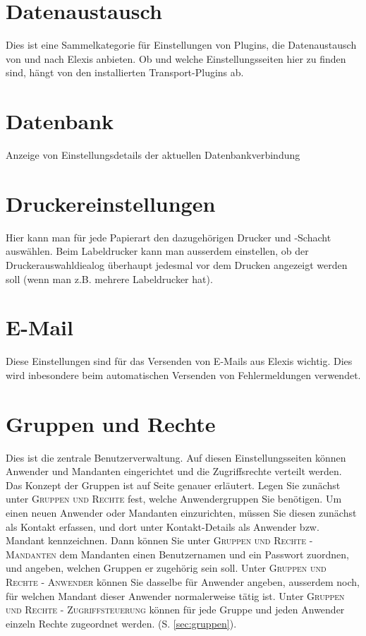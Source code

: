 \section{Datenaustausch}
Dies ist eine Sammelkategorie für Einstellungen von Plugins, die Datenaustausch von und nach Elexis anbieten. Ob und welche Einstellungsseiten hier zu finden sind, hängt von den installierten Transport-Plugins ab.
\section{Datenbank}
Anzeige von Einstellungsdetails der aktuellen Datenbankverbindung
\section{Druckereinstellungen}
Hier kann man für jede Papierart den dazugehörigen Drucker und -Schacht auswählen. Beim Labeldrucker kann man ausserdem einstellen, ob der Druckerauswahldiealog überhaupt jedesmal vor dem Drucken angezeigt werden soll (wenn man z.B. mehrere Labeldrucker hat).
\section{E-Mail}
Diese Einstellungen sind für das Versenden von E-Mails aus Elexis wichtig. Dies wird inbesondere beim automatischen Versenden von Fehlermeldungen verwendet. 

\section{Gruppen und Rechte}
Dies ist die zentrale Benutzerverwaltung. Auf diesen Einstellungsseiten können Anwender und Mandanten eingerichtet und die Zugriffsrechte verteilt werden. Das Konzept der Gruppen ist auf Seite \pageref{sec:gruppen} genauer erläutert.
Legen Sie zunächst unter \textsc{Gruppen und Rechte} fest, welche Anwendergruppen Sie benötigen.
Um einen neuen Anwender oder Mandanten einzurichten, müssen Sie diesen zunächst als \glqq Kontakt \grqq{} erfassen, und dort unter Kontakt-Details als Anwender bzw. Mandant kennzeichnen. Dann können Sie unter \textsc{Gruppen und Rechte - Mandanten} dem Mandanten einen Benutzernamen und ein Passwort zuordnen, und angeben, welchen Gruppen er zugehörig sein soll.
Unter \textsc{Gruppen und Rechte - Anwender} können Sie dasselbe für Anwender angeben, ausserdem noch, für welchen Mandant dieser Anwender normalerweise tätig ist.
Unter \textsc{Gruppen und Rechte - Zugriffsteuerung} können für jede Gruppe und jeden Anwender einzeln Rechte zugeordnet werden.  (S. \ref{sec:gruppen}).
